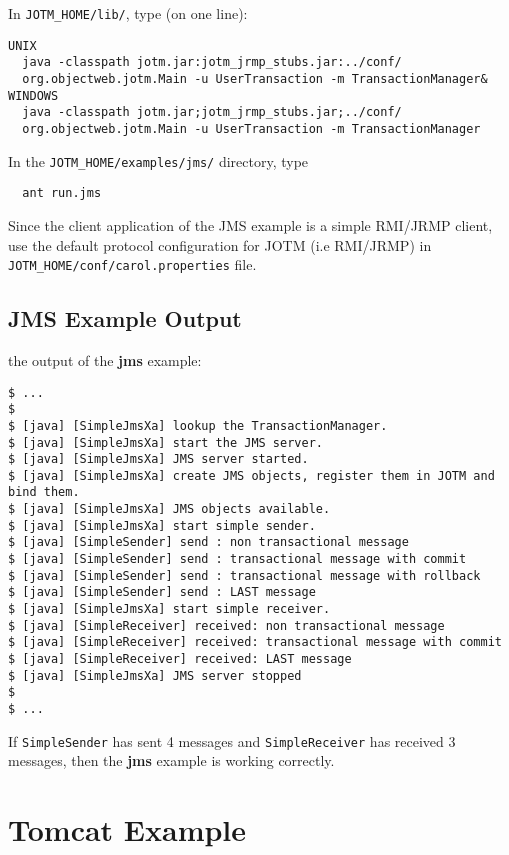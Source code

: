 \documentclass[a4paper,11pt]{article}
\begin{document}
In \texttt{JOTM\_HOME/lib/}, type (on one line):
\begin{verbatim}
UNIX
  java -classpath jotm.jar:jotm_jrmp_stubs.jar:../conf/  
  org.objectweb.jotm.Main -u UserTransaction -m TransactionManager&
WINDOWS
  java -classpath jotm.jar;jotm_jrmp_stubs.jar;../conf/ 
  org.objectweb.jotm.Main -u UserTransaction -m TransactionManager
\end{verbatim}

\noindent In the \texttt{JOTM\_HOME/examples/jms/} directory, type
\begin{verbatim}
  ant run.jms
\end{verbatim}

\noindent Since the client application of the JMS example is a simple
RMI/JRMP client, use the default protocol configuration for JOTM (i.e
RMI/JRMP) in \texttt{JOTM\_HOME/conf/carol.properties} file.
\subsection{JMS Example Output}
\label{sec:jms_output}

the output of the \textbf{jms} example:
\begin{verbatim}
$ ...
$
$ [java] [SimpleJmsXa] lookup the TransactionManager.
$ [java] [SimpleJmsXa] start the JMS server.
$ [java] [SimpleJmsXa] JMS server started.
$ [java] [SimpleJmsXa] create JMS objects, register them in JOTM and bind them.
$ [java] [SimpleJmsXa] JMS objects available.
$ [java] [SimpleJmsXa] start simple sender.
$ [java] [SimpleSender] send : non transactional message
$ [java] [SimpleSender] send : transactional message with commit
$ [java] [SimpleSender] send : transactional message with rollback
$ [java] [SimpleSender] send : LAST message
$ [java] [SimpleJmsXa] start simple receiver.
$ [java] [SimpleReceiver] received: non transactional message
$ [java] [SimpleReceiver] received: transactional message with commit
$ [java] [SimpleReceiver] received: LAST message
$ [java] [SimpleJmsXa] JMS server stopped
$
$ ...
\end{verbatim}

\noindent If \texttt{SimpleSender} has sent 4 messages and
\texttt{SimpleReceiver} has received 3 messages, then
the \textbf{jms} example is working correctly.


\section{Tomcat Example}
\label{sec:tomcat_example}
\end{document}
